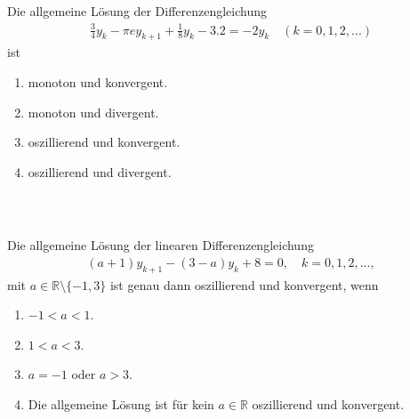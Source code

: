 \subsection*{}
Die allgemeine Lösung der Differenzengleichung
\begin{align*}
\frac{3}{4} y_k - \pi  e y_{k+1} + \frac{1}{8} y_k -3.2 = -2 y_k \quad (k=0,1,2,...)
\end{align*}
ist
\renewcommand{\labelenumi}{(\alph{enumi})}
\begin{enumerate}
\item
monoton und konvergent.
\item
monoton und divergent.	
\item 
oszillierend und konvergent.
\item
oszillierend und divergent.
\end{enumerate}
\ \\
\subsection*{}
Die allgemeine Lösung der linearen Differenzengleichung
\begin{align*}
(a+1) y_{k+1} - (3-a) y_k + 8 = 0, \quad k = 0,1,2,...,
\end{align*}
mit $ a \in \mathbb{R} \setminus \{-1,3  \} $ ist genau dann oszillierend und konvergent, wenn
\renewcommand{\labelenumi}{(\alph{enumi})}
\begin{enumerate}
	\item 
	$ -1 < a < 1 $.
	\item
	$1 < a < 3 $.
	\item
	$ a = -1 $ oder $ a > 3 $.
	\item
	Die allgemeine Lösung ist für kein $ a \in \mathbb{R} $ oszillierend und konvergent.
\end{enumerate}